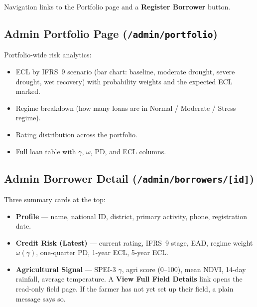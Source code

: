 \documentclass[12pt,a4paper]{article}
\begin{document}
Navigation links to the Portfolio page and a \textbf{Register Borrower} button.

\subsection{Admin Portfolio Page (\texttt{/admin/portfolio})}

Portfolio-wide risk analytics:

\begin{itemize}[leftmargin=1.5em]
  \item ECL by IFRS~9 scenario (bar chart: baseline, moderate drought, severe
        drought, wet recovery) with probability weights and the expected ECL
        marked.
  \item Regime breakdown (how many loans are in Normal / Moderate / Stress
        regime).
  \item Rating distribution across the portfolio.
  \item Full loan table with $\gamma$, $\omega$, PD, and ECL columns.
\end{itemize}

\subsection{Admin Borrower Detail (\texttt{/admin/borrowers/[id]})}

Three summary cards at the top:

\begin{itemize}[leftmargin=1.5em]
  \item \textbf{Profile} --- name, national ID, district, primary activity,
        phone, registration date.
  \item \textbf{Credit Risk (Latest)} --- current rating, IFRS~9 stage, EAD,
        regime weight $\omega(\gamma)$, one-quarter PD, 1-year ECL, 5-year ECL.
  \item \textbf{Agricultural Signal} --- SPEI-3 $\gamma$, agri score (0--100),
        mean NDVI, 14-day rainfall, average temperature.  A
        \textbf{View Full Field Details} link opens the read-only field page.
        If the farmer has not yet set up their field, a plain message says so.
\end{itemize}
\end{document}
